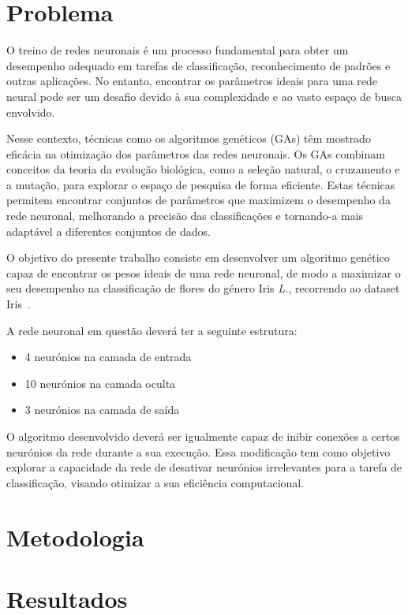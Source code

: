 \documentclass[a4paper, portuguese]{report}
\begin{document}
\chapter{Problema}\label{chapter:problem}

O treino de redes neuronais é um processo fundamental para obter um desempenho adequado em tarefas de classificação, reconhecimento de padrões e outras aplicações. No entanto, encontrar os parâmetros ideais para uma rede neural pode ser um desafio devido à sua complexidade e ao vasto espaço de busca envolvido. 

Nesse contexto, técnicas como os algoritmos genéticos (GAs) têm mostrado eficácia na otimização dos parâmetros das redes neuronais. Os GAs combinam conceitos da teoria da evolução biológica, como a seleção natural, o cruzamento e a mutação, para explorar o espaço de pesquisa de forma eficiente. Estas técnicas permitem encontrar conjuntos de parâmetros que maximizem o desempenho da rede neuronal, melhorando a precisão das classificações e tornando-a mais adaptável a diferentes conjuntos de dados.

O objetivo do presente trabalho consiste em desenvolver um algoritmo genético capaz de encontrar os pesos ideais de uma rede neuronal, de modo a maximizar o seu desempenho na classificação de flores do género Iris \textit{L.}, recorrendo ao dataset Iris~\cite{Fisher1988}.

A rede neuronal em questão deverá ter a seguinte estrutura:
\begin{itemize}
    \item 4 neurónios na camada de entrada
    \item 10 neurónios na camada oculta
    \item 3 neurónios na camada de saída
\end{itemize}

O algoritmo desenvolvido deverá ser igualmente capaz de inibir conexões a certos neurónios da rede durante a sua execução. Essa modificação tem como objetivo explorar a capacidade da rede de desativar neurónios irrelevantes para a tarefa de classificação, visando otimizar a sua eficiência computacional.

\chapter{Metodologia}\label{chapter:methodology}


\chapter{Resultados}\label{chapter:results}

\end{document}
